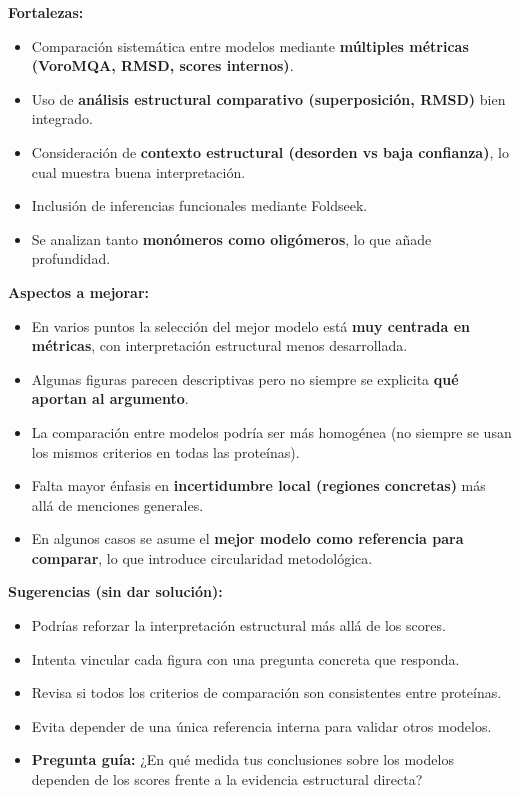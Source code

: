 \documentclass[
  11pt,
  a4paper,
  twoside]{scrreprt}
\begin{document}
\textbf{Fortalezas:}

\begin{itemize}
\item
  Comparación sistemática entre modelos mediante \textbf{múltiples
  métricas (VoroMQA, RMSD, scores internos)}.
\item
  Uso de \textbf{análisis estructural comparativo (superposición, RMSD)}
  bien integrado.
\item
  Consideración de \textbf{contexto estructural (desorden vs baja
  confianza)}, lo cual muestra buena interpretación.
\item
  Inclusión de inferencias funcionales mediante Foldseek.
\item
  Se analizan tanto \textbf{monómeros como oligómeros}, lo que añade
  profundidad.
\end{itemize}

\textbf{Aspectos a mejorar:}

\begin{itemize}
\item
  En varios puntos la selección del mejor modelo está \textbf{muy
  centrada en métricas}, con interpretación estructural menos
  desarrollada.
\item
  Algunas figuras parecen descriptivas pero no siempre se explicita
  \textbf{qué aportan al argumento}.
\item
  La comparación entre modelos podría ser más homogénea (no siempre se
  usan los mismos criterios en todas las proteínas).
\item
  Falta mayor énfasis en \textbf{incertidumbre local (regiones
  concretas)} más allá de menciones generales.
\item
  En algunos casos se asume el \textbf{mejor modelo como referencia para
  comparar}, lo que introduce circularidad metodológica.
\end{itemize}

\textbf{Sugerencias (sin dar solución):}

\begin{itemize}
\item
  Podrías reforzar la interpretación estructural más allá de los scores.
\item
  Intenta vincular cada figura con una pregunta concreta que responda.
\item
  Revisa si todos los criterios de comparación son consistentes entre
  proteínas.
\item
  Evita depender de una única referencia interna para validar otros
  modelos.
\item
  \textbf{Pregunta guía:} ¿En qué medida tus conclusiones sobre los
  modelos dependen de los scores frente a la evidencia estructural
  directa?
\end{itemize}
\end{document}
